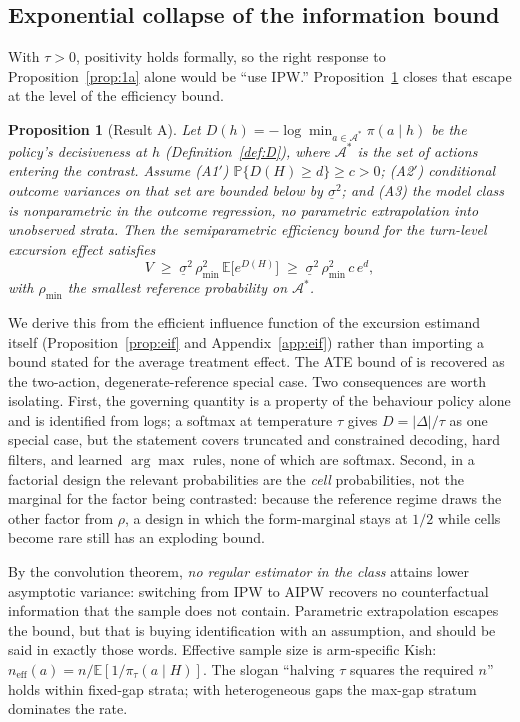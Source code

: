 \documentclass[11pt]{article}
\newtheorem{proposition}{Proposition}
\theoremstyle{definition}
\theoremstyle{remark}
\newcommand{\E}{\mathbb{E}}
\newcommand{\Prob}{\mathbb{P}}
\begin{document}
\subsection{Exponential collapse of the information bound}\label{sec:resultA}

With $\tau > 0$, positivity holds formally, so the right response to
Proposition~\ref{prop:1a} alone would be ``use IPW.'' Proposition~\ref{prop:a} closes that
escape at the level of the efficiency bound.

\begin{proposition}[Result A]\label{prop:a}
Let $D(h) = -\log\min_{a \in \mathcal{A}^*} \pi(a \mid h)$ be the policy's
decisiveness at $h$ (Definition~\ref{def:D}), where $\mathcal{A}^*$ is the
set of actions entering the contrast. Assume (A1$'$) $\Prob\{D(H) \geq d\}
\geq c > 0$; (A2$'$) conditional outcome variances on that set are bounded
below by $\underline{\sigma}^2$; and (A3) the model class is nonparametric in
the outcome regression, no parametric extrapolation into unobserved
strata. Then the semiparametric efficiency bound for the turn-level
excursion effect satisfies
\[
V \;\geq\; \underline{\sigma}^2\,\rho_{\min}^2\,\E\big[e^{D(H)}\big]
\;\geq\; \underline{\sigma}^2\,\rho_{\min}^2\,c\,e^{d},
\]
with $\rho_{\min}$ the smallest reference probability on $\mathcal{A}^*$.
\end{proposition}

We derive this from the efficient influence function of the excursion
estimand itself (Proposition~\ref{prop:eif} and Appendix~\ref{app:eif}) rather than importing a bound stated for the average
treatment effect. The ATE bound of \citet{hahn1998role} is recovered as the
two-action, degenerate-reference special case. Two consequences are worth
isolating. First, the governing quantity is a property of the behaviour
policy alone and is identified from logs; a softmax at temperature $\tau$
gives $D = |\Delta|/\tau$ as one special case, but the statement covers
truncated and constrained decoding, hard filters, and learned $\arg\max$
rules, none of which are softmax. Second, in a factorial design the relevant
probabilities are the \emph{cell} probabilities, not the marginal for the
factor being contrasted: because the reference regime draws the other factor
from $\rho$, a design in which the form-marginal stays at $1/2$ while cells
become rare still has an exploding bound.

By the convolution theorem, \emph{no regular estimator in the class} attains
lower asymptotic variance: switching from IPW to AIPW recovers no
counterfactual information that the sample does not contain. Parametric
extrapolation escapes the bound, but that is buying identification with an
assumption, and should be said in exactly those words. Effective sample size
is arm-specific Kish: $n_{\mathrm{eff}}(a) = n / \E[1/\pi_\tau(a \mid H)]$.
The slogan ``halving $\tau$ squares the required $n$'' holds within
fixed-gap strata; with heterogeneous gaps the max-gap stratum dominates the
rate.
\end{document}
